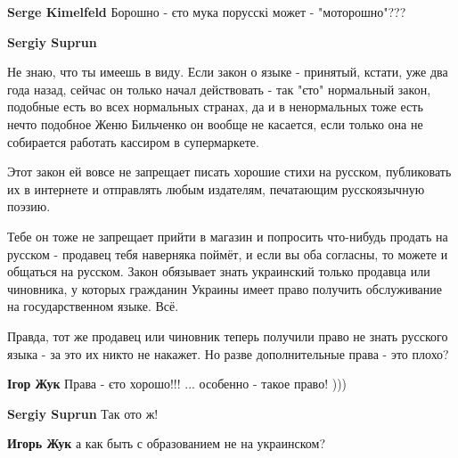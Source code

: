 \begin{itemize}
\begin{itemize}
\textbf{Serge Kimelfeld} Борошно - єто мука порусскі
может - "моторошно"???

 
\textbf{Sergiy Suprun} 

Не знаю, что ты имеешь в виду. Если закон о языке - принятый, кстати, уже два
года назад, сейчас он только начал действовать - так "єто" нормальный закон,
подобные есть во всех нормальных странах, да и в ненормальных тоже есть нечто
подобное \Smiley[1.0][yellow] Женю Бильченко он вообще не касается, если только она не собирается
работать кассиром в супермаркете. 

Этот закон ей вовсе не запрещает писать хорошие стихи на русском, публиковать
их в интернете и отправлять любым издателям, печатающим русскоязычную поэзию. 

Тебе он тоже не запрещает прийти в магазин и попросить что-нибудь продать на
русском - продавец тебя наверняка поймёт, и если вы оба согласны, то можете и
общаться на русском. Закон обязывает знать украинский только продавца или
чиновника, у которых гражданин Украины имеет право получить обслуживание на
государственном языке. Всё.

Правда, тот же продавец или чиновник теперь получили право не знать русского
языка - за это их никто не накажет. Но разве дополнительные права - это плохо?
\Smiley[1.0][yellow]

 
\textbf{Ігор Жук} Права - єто хорошо!!!
... особенно - такое право!
)))

 
\textbf{Sergiy Suprun} Так ото ж! \Smiley[1.0][yellow]

 
\textbf{Игорь Жук} а как быть с образованием не на украинском?

\end{itemize}

 

\end{itemize}

